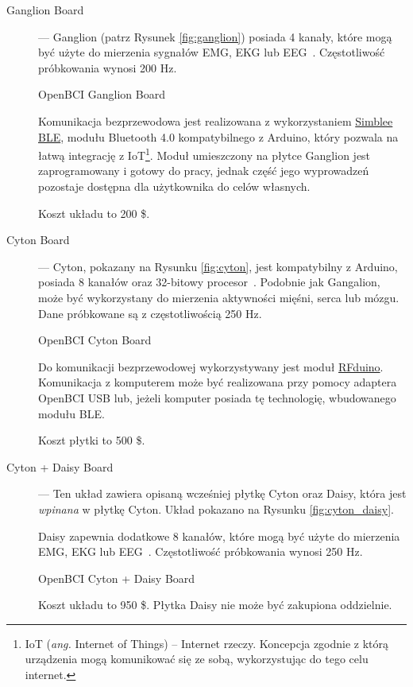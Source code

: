 \documentclass[skorowidz,skroty]{dyplomWEZUT}
\begin{document}
\begin{description}
    \item [Ganglion Board] --- Ganglion (patrz Rysunek \vref{fig:ganglion}) posiada 4 kanały, które mogą być użyte do mierzenia sygnałów EMG, EKG lub EEG~\cite{ganglion_shop}. Częstotliwość próbkowania wynosi 200 Hz.

    {OpenBCI Ganglion Board\label{fig:ganglion}}
    {\cite{ganglion_shop}}

    Komunikacja bezprzewodowa jest realizowana z wykorzystaniem \href{https://www.sparkfun.com/simblee}{Simblee BLE}, modułu Bluetooth 4.0 kompatybilnego z Arduino, który pozwala na łatwą integrację z IoT\footnote{IoT (\textit{ang.} Internet of Things) -- Internet rzeczy. Koncepcja zgodnie z którą urządzenia mogą komunikować się ze sobą, wykorzystując do tego celu internet.}. Moduł umieszczony na płytce Ganglion jest zaprogramowany i gotowy do pracy, jednak część jego wyprowadzeń pozostaje dostępna dla użytkownika do celów własnych.

    Koszt układu to 200 \$.

    \item[Cyton Board] --- Cyton, pokazany na Rysunku \vref{fig:cyton}, jest kompatybilny z Arduino, posiada 8 kanałów oraz 32-bitowy procesor~\cite{cyton_shop}. Podobnie jak Gangalion, może być wykorzystany do mierzenia aktywności mięśni, serca lub mózgu. Dane próbkowane są z częstotliwością 250 Hz.

    {OpenBCI Cyton Board\label{fig:cyton}}
    {\cite{cyton_shop}}

    Do komunikacji bezprzewodowej wykorzystywany jest moduł \href{https://eu.mouser.com/new/rfdigital/rf-digital-rfduino/}{RFduino}. Komunikacja z komputerem może być realizowana przy pomocy adaptera OpenBCI USB lub, jeżeli komputer posiada tę technologię, wbudowanego modułu BLE.

    Koszt płytki to 500 \$.

    \item[Cyton + Daisy Board] --- Ten układ zawiera opisaną wcześniej płytkę Cyton oraz Daisy, która jest \textit{wpinana} w płytkę Cyton. Układ pokazano na Rysunku \vref{fig:cyton_daisy}.

    Daisy zapewnia dodatkowe 8 kanałów, które mogą być użyte do mierzenia EMG, EKG lub EEG~\cite{cytondaisy_shop}. Częstotliwość próbkowania wynosi 250 Hz.

    {OpenBCI Cyton + Daisy Board\label{fig:cyton_daisy}}
    {\cite{cytondaisy_shop}}

    Koszt układu to 950 \$. Płytka Daisy nie może być zakupiona oddzielnie.
\end{description}
\end{document}
